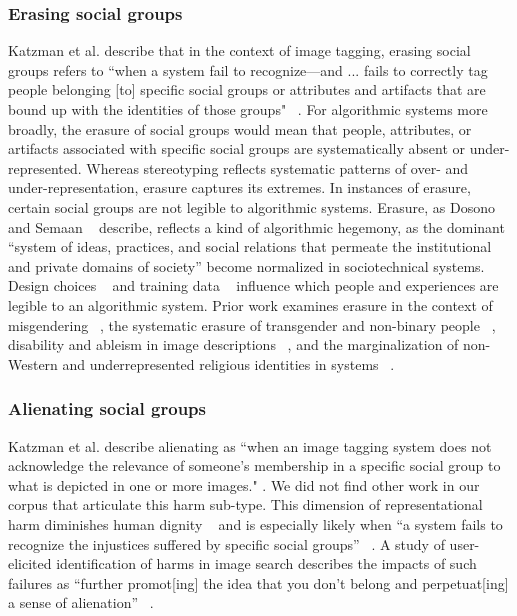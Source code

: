 \subsubsection{Erasing social groups} Katzman et al. describe that in the context of image tagging, erasing social groups refers to ``when a system fail to recognize—and ... fails to correctly tag people belonging [to] specific social groups or attributes and artifacts that are bound up with the identities of those groups" ~\cite[p. 3-4]{Katzman_Barocas_Blodgett_Laird_Scheuerman_Wallach_2021}. For algorithmic systems more broadly, the erasure of social groups would mean that people, attributes, or artifacts associated with specific social groups are systematically absent or under-represented. Whereas stereotyping reflects systematic patterns of over- and under-representation, erasure captures its extremes. In instances of erasure, certain social groups are not legible to algorithmic systems. Erasure, as Dosono and Semaan ~\cite[p. 1]{Dosono_Semaan_2020} describe, reflects a kind of algorithmic hegemony, as the dominant “system of ideas, practices, and social relations that permeate the institutional and private domains of society” become normalized in sociotechnical systems. Design choices ~\cite{mengesha2021don} and training data ~\cite{Suresh_Guttag_2021} influence which people and experiences are legible to an algorithmic system. Prior work examines erasure in the context of misgendering ~\cite{Dev_Monajatipoor_Ovalle_Subramonian_Phillips_Chang_2021, Keyes_2018}, the systematic erasure of transgender and non-binary people ~\cite{Dev_Monajatipoor_Ovalle_Subramonian_Phillips_Chang_2021, Keyes_2018}, disability and ableism in image descriptions ~\cite{Bennett_Gleason_Scheuerman_Bigham_Guo_To_2021}, and the marginalization of non-Western and underrepresented religious identities in systems ~\cite{Katzman_Barocas_Blodgett_Laird_Scheuerman_Wallach_2021}.   

\subsubsection{Alienating social groups} \label{sec:representative_alienation} Katzman et al. describe alienating as ``when an image tagging system does not acknowledge the relevance of someone's membership in a specific social group to what is depicted in one or more images." \cite[p. 4]{Katzman_Barocas_Blodgett_Laird_Scheuerman_Wallach_2021}. We did not find other work in our corpus that articulate this harm sub-type. This dimension of representational harm diminishes human dignity ~\cite{Mannes_2020} and is especially likely when “a system fails to recognize the injustices suffered by specific social groups” ~\cite[p. 4]{Katzman_Barocas_Blodgett_Laird_Scheuerman_Wallach_2021}. A study of user-elicited identification of harms in image search describes the impacts of such failures as “further promot[ing] the idea that you don’t belong and perpetuat[ing] a sense of alienation” ~\cite[p. 8]{DeVos_Dhabalia_Shen_Holstein_Eslami_2022}. 

